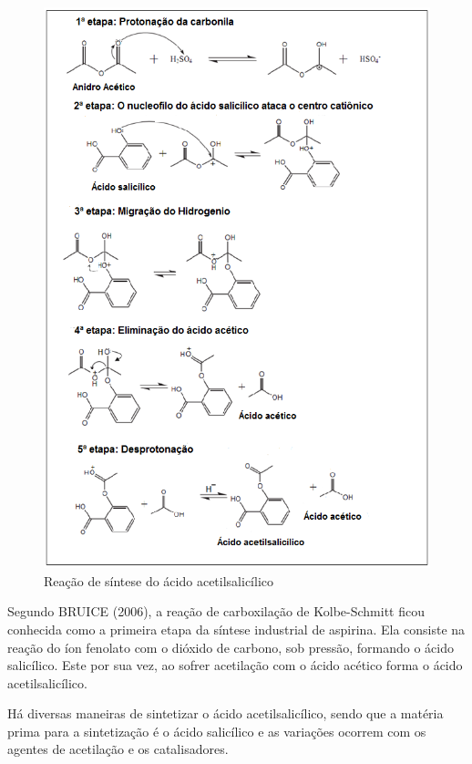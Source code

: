 \begin{figure}[H]
\begin{center}
    \includegraphics[width=1.1\textwidth]{figuras/im2_sintese.png}
\end{center}
\caption{Reação de síntese do ácido acetilsalicílico}\label{fig:im2}%
\end{figure}

Segundo BRUICE (2006), a reação de carboxilação de Kolbe-Schmitt ficou conhecida como a primeira
etapa da síntese industrial de aspirina. Ela consiste na reação do íon fenolato com o dióxido de
carbono, sob pressão, formando o ácido salicílico. Este por sua vez, ao sofrer acetilação com o
ácido acético forma o ácido acetilsalicílico.~\cite{Bruice2006}

Há diversas maneiras de sintetizar o ácido acetilsalicílico, sendo que a matéria prima para a
sintetização é o ácido salicílico e as variações ocorrem com os agentes de acetilação e os
catalisadores.


